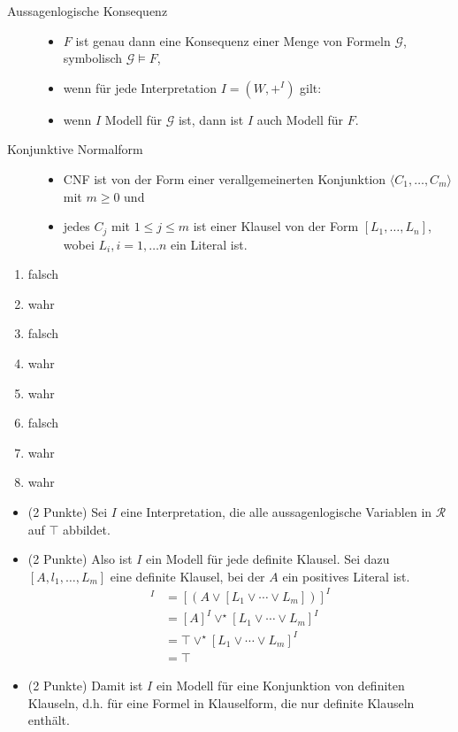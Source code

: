 \documentclass[a4paper, 11pt, ngerman]{scrartcl}
\begin{document}
\begin{description}
\item[Aussagenlogische Konsequenz]
\begin{itemize}
	\item $F$ ist genau dann eine Konsequenz einer Menge von Formeln $\mathcal{G}$, symbolisch $\mathcal{G} \models F$, 
	\item wenn für jede Interpretation $I=(W,+^I)$ gilt:
	\item wenn $I$ Modell für $\mathcal{G}$ ist, dann ist $I$ auch Modell für $F$.
\end{itemize}

\item[Konjunktive Normalform]
\begin{itemize}
	\item CNF ist von der Form einer verallgemeinerten Konjunktion $\langle C_1, \dots , C_m \rangle$ mit $m \geq 0$ und 
	\item jedes $C_j$ mit $1 \leq j \leq m$ ist einer Klausel von der Form $[L_1, \dots , L_n]$, wobei $L_i, i=1, \dots n$ ein Literal ist.
\end{itemize}
\end{description}

\vspace{6pt}

\begin{enumerate}[label=(\alph*)]
	\item falsch
	\item wahr
	\item falsch
	\item wahr
	\item wahr
	\item falsch
	\item wahr
	\item wahr
\end{enumerate}

\newpage


\begin{itemize}
	\item (2 Punkte) Sei $I$ eine Interpretation, die alle aussagenlogische Variablen in $\mathcal{R}$ auf $\top$ abbildet.
	\item (2 Punkte) Also ist $I$ ein Modell für jede definite Klausel. Sei dazu $[A, l_1, \dots , L_m]$ eine definite Klausel, bei der $A$ ein positives Literal ist.
	\begin{align*}
		[A, l_1, \dots , L_m]^I &= [(A \lor [L_1 \lor \cdots \lor L_m])]^I \\
		&= [A]^I \lor^{\star} [L_1 \lor \cdots \lor L_m]^I \\
		&= \top \lor^{\star} [L_1 \lor \cdots \lor L_m]^I \\
		&= \top
	\end{align*}
	\item (2 Punkte) Damit ist $I$ ein Modell für eine Konjunktion von definiten Klauseln, d.h. für eine Formel in Klauselform, die nur definite Klauseln enthält.
\end{itemize}
\end{document}
